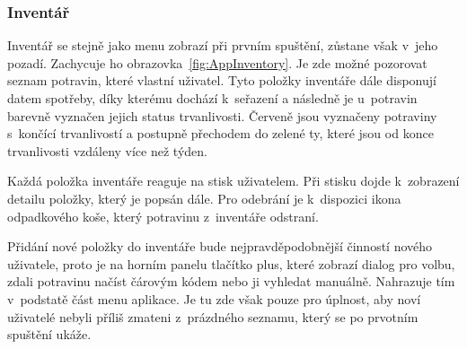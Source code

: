 \documentclass[thesis=B,czech]{FITthesis}[2013/10/20]
\begin{document}
\clearpage

\subsubsection{Inventář}

Inventář se stejně jako menu zobrazí při prvním spuštění, zůstane však v~jeho pozadí. Zachycuje ho obrazovka~\ref{fig:AppInventory}. Je zde možné pozorovat seznam potravin, které vlastní uživatel. Tyto položky inventáře dále disponují datem spotřeby, díky kterému dochází k~seřazení a následně je u~potravin barevně vyznačen jejich status trvanlivosti. Červeně jsou vyznačeny potraviny s~končící trvanlivostí a postupně přechodem do zelené ty, které jsou od konce trvanlivosti vzdáleny více než týden.

Každá položka inventáře reaguje na stisk uživatelem. Při stisku dojde k~zobrazení detailu položky, který je popsán dále. Pro odebrání je k~dispozici ikona odpadkového koše, který potravinu z~inventáře odstraní.

Přidání nové položky do inventáře bude nejpravděpodobnější činností nového uživatele, proto je na horním panelu tlačítko plus, které zobrazí dialog pro volbu, zdali potravinu načíst čárovým kódem nebo ji vyhledat manuálně. Nahrazuje tím v~podstatě část menu aplikace. Je tu zde však pouze pro úplnost, aby noví uživatelé nebyli příliš zmateni z~prázdného seznamu, který se po prvotním spuštění ukáže.
\end{document}
